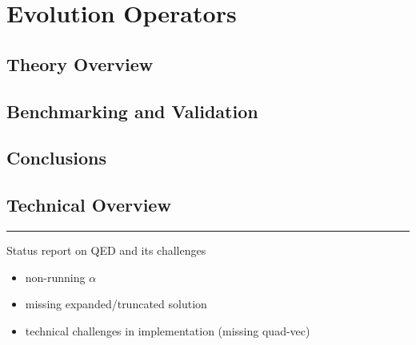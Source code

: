 
\chapter{Evolution Operators}
\label{ch:eko}
\minitoc
\adjustmtc



\section{Theory Overview}
\label{sec:eko/theory}


\section{Benchmarking and Validation}
\label{sec:eko/pheno}


\section{Conclusions}
\label{sec:eko/concl}


\section{Technical Overview}
\label{app:eko/code}


\vspace*{20pt}
\noindent
\rule{\hsize}{1pt}

Status report on QED and its challenges

\begin{itemize}
	\item non-running $\alpha$
	\item missing expanded/truncated solution
	\item technical challenges in implementation (missing quad-vec)
\end{itemize}
